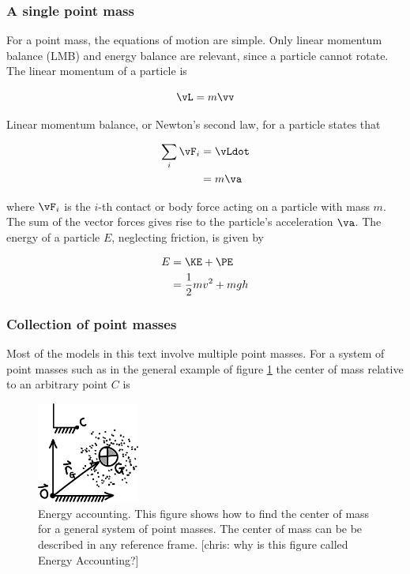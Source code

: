 \subsubsection*{A single point mass}
For a point mass, the equations of motion are simple. Only linear momentum balance (LMB) and energy balance are relevant, since a particle cannot rotate. The linear momentum of a particle is

\begin{equation}
\vL = m\vv
\end{equation}

Linear momentum balance, or Newton's second law, for a particle states that

\begin{align}
\sum_{i} \vF_{i} &= \vLdot \\
&= m \va
\end{align}

where $\vF_{i}$ is the $i$-th contact or body force acting on a particle with mass $m$. The sum of the vector forces gives rise to the particle's acceleration $\va$. The energy of a particle $E$, neglecting friction, is given by

\begin{align}
E &= \KE + \PE \\
&= \frac{1}{2}mv^{2} + mgh
\end{align}

\subsubsection*{Collection of point masses}
Most of the models in this text involve multiple point masses. For a system of point masses such as in the general example of figure \ref{fig:EnergyAccounting} the center of mass relative to an arbitrary point $C$ is

\begin{figure}[h]		%
\begin{centering}
\includegraphics[width=0.3\textwidth]{Figures/EnergyAccounting}\par
\end{centering}
\caption[Diagram: Energy Accounting]{Energy accounting. This figure shows how to find the center of mass for a general system of point masses. The center of mass can be be described in any reference frame. [chris: why is this figure called Energy Accounting?]}
\label{fig:EnergyAccounting}
\end{figure}
%

